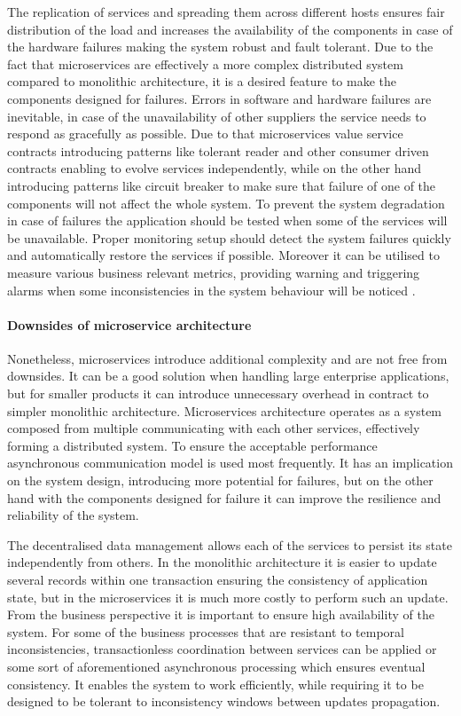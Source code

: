 The replication of services and spreading them across different hosts ensures fair distribution of the load and increases the availability of the components in case of the hardware failures making the system robust and fault tolerant. Due to the fact that microservices are effectively a more complex distributed system compared to monolithic architecture, it is a desired feature to make the components designed for failures. Errors in software and hardware failures are inevitable, in case of the unavailability of other suppliers the service needs to respond as gracefully as possible. Due to that microservices value service contracts introducing patterns like tolerant reader and other consumer driven contracts enabling to evolve services independently, while on the other hand introducing patterns like circuit breaker to make sure that failure of one of the components will not affect the whole system. To prevent the system degradation in case of failures the application should be tested when some of the services will be unavailable. Proper monitoring setup should detect the system failures quickly and automatically restore the services if possible. Moreover it can be utilised to measure various business relevant metrics, providing warning and triggering alarms when some inconsistencies in the system behaviour will be noticed \cite{MicroservicesHowToMakeYourApplicationScale}.

\paragraph{Downsides of microservice architecture}

Nonetheless, microservices introduce additional complexity and are not free from downsides. It can be a good solution when handling large enterprise applications, but for smaller products it can introduce unnecessary overhead in contract to simpler monolithic architecture. Microservices architecture operates as a system composed from multiple communicating with each other services, effectively forming a distributed system. To ensure the acceptable performance asynchronous communication model is used most frequently. It has an implication on the system design, introducing more potential for failures, but on the other hand with the components designed for failure it can improve the resilience and reliability of the system.

The decentralised data management allows each of the services to persist its state independently from others. In the monolithic architecture it is easier to update several records within one transaction ensuring the consistency of application state, but in the microservices it is much more costly to perform such an update. From the business perspective it is important to ensure high availability of the system. For some of the business processes that are resistant to temporal inconsistencies, transactionless coordination between services can be applied or some sort of aforementioned asynchronous processing which ensures eventual consistency. It enables the system to work efficiently, while requiring it to be designed to be tolerant to inconsistency windows between updates propagation.

